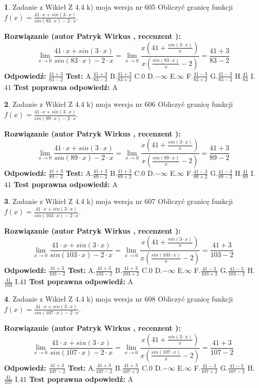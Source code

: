 \documentclass[12pt, a4paper]{article}
\theoremstyle{definition} %
\newtheorem{zad}{}
\newcommand{\zadStart}[1]{\begin{zad}#1\newline}
\newcommand{\zadStop}{\end{zad}}
\newcommand{\rozwStart}[2]{\noindent \textbf{Rozwiązanie (autor #1 , recenzent #2): }\newline}
\newcommand{\rozwStop}{\newline}
\newcommand{\odpStart}{\noindent \textbf{Odpowiedź:}\newline}
\newcommand{\odpStop}{\newline}
\newcommand{\testStart}{\noindent \textbf{Test:}\newline}
\newcommand{\testStop}{\newline}
\newcommand{\kluczStart}{\noindent \textbf{Test poprawna odpowiedź:}\newline}
\newcommand{\kluczStop}{\newline}
\begin{document}
\zadStart{Zadanie z Wikieł Z 4.4 k) moja wersja nr 605}
Obliczyć granicę funkcji $f(x)=\frac{41\cdot x +sin(3\cdot x)}{sin(83\cdot x) -2\cdot x}$.
\zadStop
\rozwStart{Patryk Wirkus}{}
$$\lim\limits_{x\to 0}\frac{41\cdot x +sin(3\cdot x)}{sin(83\cdot x) -2\cdot x}
=\lim\limits_{x\to 0}\frac{x(41+\frac{sin(3\cdot x)}{x})}{x(\frac{sin(83\cdot x)}{x}-2)}
=\frac{41+3}{83-2}$$
\rozwStop
\odpStart
$\frac{41+3}{83-2}$
\odpStop
\testStart
A.$\frac{41+3}{83-2}$
B.$\frac{41+3}{83+2}$
C.$0$
D.$-\infty$
E.$\infty$
F.$\frac{41-3}{83+2}$
G.$\frac{41-3}{83-2}$
H.$\frac{41}{83}$
I.$41$
\testStop
\kluczStart
A
\kluczStop



\zadStart{Zadanie z Wikieł Z 4.4 k) moja wersja nr 606}
Obliczyć granicę funkcji $f(x)=\frac{41\cdot x +sin(3\cdot x)}{sin(89\cdot x) -2\cdot x}$.
\zadStop
\rozwStart{Patryk Wirkus}{}
$$\lim\limits_{x\to 0}\frac{41\cdot x +sin(3\cdot x)}{sin(89\cdot x) -2\cdot x}
=\lim\limits_{x\to 0}\frac{x(41+\frac{sin(3\cdot x)}{x})}{x(\frac{sin(89\cdot x)}{x}-2)}
=\frac{41+3}{89-2}$$
\rozwStop
\odpStart
$\frac{41+3}{89-2}$
\odpStop
\testStart
A.$\frac{41+3}{89-2}$
B.$\frac{41+3}{89+2}$
C.$0$
D.$-\infty$
E.$\infty$
F.$\frac{41-3}{89+2}$
G.$\frac{41-3}{89-2}$
H.$\frac{41}{89}$
I.$41$
\testStop
\kluczStart
A
\kluczStop



\zadStart{Zadanie z Wikieł Z 4.4 k) moja wersja nr 607}
Obliczyć granicę funkcji $f(x)=\frac{41\cdot x +sin(3\cdot x)}{sin(103\cdot x) -2\cdot x}$.
\zadStop
\rozwStart{Patryk Wirkus}{}
$$\lim\limits_{x\to 0}\frac{41\cdot x +sin(3\cdot x)}{sin(103\cdot x) -2\cdot x}
=\lim\limits_{x\to 0}\frac{x(41+\frac{sin(3\cdot x)}{x})}{x(\frac{sin(103\cdot x)}{x}-2)}
=\frac{41+3}{103-2}$$
\rozwStop
\odpStart
$\frac{41+3}{103-2}$
\odpStop
\testStart
A.$\frac{41+3}{103-2}$
B.$\frac{41+3}{103+2}$
C.$0$
D.$-\infty$
E.$\infty$
F.$\frac{41-3}{103+2}$
G.$\frac{41-3}{103-2}$
H.$\frac{41}{103}$
I.$41$
\testStop
\kluczStart
A
\kluczStop



\zadStart{Zadanie z Wikieł Z 4.4 k) moja wersja nr 608}
Obliczyć granicę funkcji $f(x)=\frac{41\cdot x +sin(3\cdot x)}{sin(107\cdot x) -2\cdot x}$.
\zadStop
\rozwStart{Patryk Wirkus}{}
$$\lim\limits_{x\to 0}\frac{41\cdot x +sin(3\cdot x)}{sin(107\cdot x) -2\cdot x}
=\lim\limits_{x\to 0}\frac{x(41+\frac{sin(3\cdot x)}{x})}{x(\frac{sin(107\cdot x)}{x}-2)}
=\frac{41+3}{107-2}$$
\rozwStop
\odpStart
$\frac{41+3}{107-2}$
\odpStop
\testStart
A.$\frac{41+3}{107-2}$
B.$\frac{41+3}{107+2}$
C.$0$
D.$-\infty$
E.$\infty$
F.$\frac{41-3}{107+2}$
G.$\frac{41-3}{107-2}$
H.$\frac{41}{107}$
I.$41$
\testStop
\kluczStart
A
\kluczStop
\end{document}
